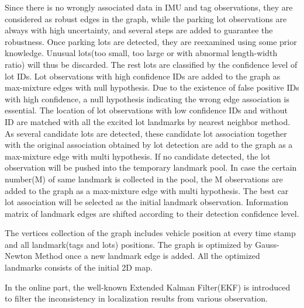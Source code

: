 \documentclass[journal]{IEEEtran}
\begin{document}
Since there is no wrongly associated data in IMU and tag observations, they are considered as robust edges in the graph, while the parking lot observations are always with high uncertainty, and several steps are added to guarantee the robustness. 
Once parking lots are detected, they are reexamined using some prior knowledge. 
Unusual lots(too small, too large or with abnormal length-width ratio) will thus be discarded. 
The rest lots are classified by the confidence level of lot IDs. Lot observations with high confidence IDs are added to the graph as max-mixture edges with null hypothesis. 
Due to the existence of false positive IDs with high confidence, a null hypothesis indicating the wrong edge association is essential. 
The location of lot observations with low confidence IDs and without ID are matched with all the excited lot landmarks by nearest neighbor method. 
As several candidate lots are detected, these candidate lot association together with the original association obtained by lot detection are add to the graph as a max-mixture edge with multi hypothesis. 
If no candidate detected, the lot observation will be pushed into the temporary landmark pool. 
In case the certain number(M) of same landmark is collected in the pool, the M observations are added to the graph as a max-mixture edge with multi hypothesis. 
The best car lot association will be selected as the initial landmark observation. Information matrix of landmark edges are shifted according to their detection confidence level.

The vertices collection of the graph includes vehicle position at every time stamp and all landmark(tags and lots) positions. 
The graph is optimized by Gauss-Newton Method once a new landmark edge is added. All the optimized landmarks consists of the initial 2D map.

In the online part, the well-known Extended Kalman Filter(EKF)\cite{Bailey2006Simultaneous} is introduced to filter the inconsistency in localization results from various observation. 
\end{document}
